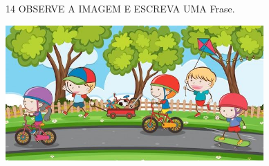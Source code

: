 






\num{14} OBSERVE A IMAGEM E ESCREVA UMA Frase.


\includegraphics[width=3.88542in,height=2.03581in]{media/image122.jpg}

